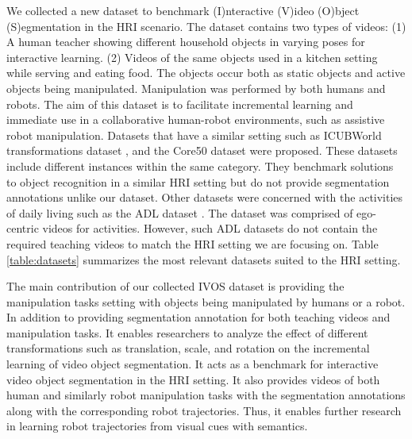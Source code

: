 \documentclass[letterpaper, 10 pt, conference]{ieeeconf}
\begin{document}
We collected a new dataset to benchmark (I)nteractive (V)ideo (O)bject (S)egmentation in the HRI scenario. The dataset contains two types of videos: (1) A human teacher showing different household objects in varying poses for interactive learning. (2) Videos of the same objects used in a kitchen setting while serving and eating food. The objects occur both as static objects and active objects being manipulated. Manipulation was performed by both humans and robots. The aim of this dataset is to facilitate incremental learning and immediate use in a collaborative human-robot environments, such as assistive robot manipulation. Datasets that have a similar setting such as ICUBWorld transformations dataset \cite{pasquale2016object}, and the Core50 dataset \cite{lomonaco2017core50} were proposed. These datasets include different instances within the same category. They benchmark solutions to object recognition in a similar HRI setting but do not provide segmentation annotations unlike our dataset. Other datasets were concerned with the activities of daily living such as the ADL dataset \cite{pirsiavash2012detecting}. The dataset was comprised of ego-centric videos for activities. However, such ADL datasets do not contain the required teaching videos to match the HRI setting we are focusing on. Table \ref{table:datasets} summarizes the most relevant datasets suited to the HRI setting.

The main contribution of our collected IVOS dataset is providing the manipulation tasks setting with objects being manipulated by humans or a robot. In addition to providing segmentation annotation for both teaching videos and manipulation tasks. It enables researchers to analyze the effect of different transformations such as translation, scale, and rotation on the incremental learning of video object segmentation. It acts as a benchmark for interactive video object segmentation in the HRI setting. It also provides videos of both human and similarly robot manipulation tasks with the segmentation annotations along with the corresponding robot trajectories. Thus, it enables further research in learning robot trajectories from visual cues with semantics. 
\end{document}
